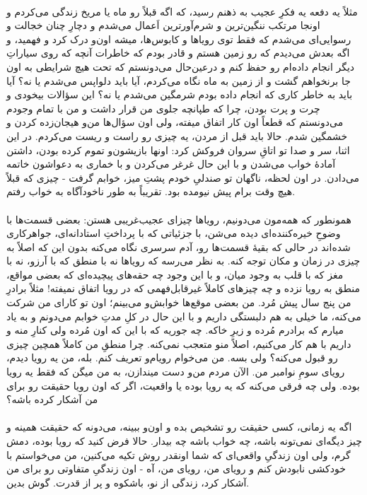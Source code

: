 \documentclass[12pt]{book}
\begin{document}
    \paragraph{}
    مثلاً یه دفعه یه فکرِ عجیب به ذهنم رسید، که اگه قبلاً رو ماه یا مریخ زندگی می‌کردم و اونجا مرتکب ننگین‌ترین و شرم‌آور‌ترین اَعمال می‌شدم و دچارِ چنان خجالت و رسوایی‌ای می‌شدم که فقط توی رویاها و کابوس‌ها، میشه اون‌و درک کرد و فهمید، و اگه بعدش می‌دیدم که رو زمین هستم و قادر بودم که خاطرات آنچه که روی سیاراتِ دیگر انجام داده‌ام رو حفظ کنم و درعین‌حال می‌دونستم که تحت هیچ شرایطی به اون جا برنخواهم گشت و از زمین به ماه نگاه می‌کردم، آیا باید دلواپس می‌شدم یا نه؟ آیا باید به خاطر کاری که انجام داده بودم شرمگین می‌شدم یا نه؟ این سؤالات بیخودی و چرت و پرت بودن، چرا که طپانچه جلوی من قرار داشت و من با تمام وجودم می‌دونستم که قطعاً اون کار اتفاق میفته، ولی اون سؤال‌ها من‌و هیجان‌زده کردن و خشمگین شدم. حالا باید قبل از مردن، یه چیزی رو راست و ریست می‌کردم. در این اثنا، سر و صدا تو اتاقِ سروان فروکش کرد: اونها بازیشون‌و تموم کرده بودن، داشتن آمادهٔ خواب می‌شدن و با این حال غرغر می‌کردن و با خماری به دعواشون خاتمه می‌دادن. در اون لحظه، ناگهان تو صندلیِ خودم پشتِ میز، خوابم گرفت - چیزی که قبلاً هیچ وقت برام پیش نیومده بود. تقریباً به طور ناخودآگاه به خواب رفتم.

    \paragraph{}
    همونطور که همه‌مون می‌دونیم، رویاها چیزای عجیب‌غریبی هستن: بعضی قسمت‌ها با وضوحِ خیره‌کننده‌ای دیده می‌شن، با جزئیاتی که با پرداختِ استادانه‌ای، جواهرکاری شده‌اند در حالی که بقیهٔ قسمت‌ها رو، آدم سرسری نگاه می‌کنه بدون این که اصلاً به چیزی در زمان و مکان توجه کنه. به نظر می‌رسه که رویاها نه با منطق که با آرزو، نه با مغز که با قلب به وجود میان، و با این وجود چه حقه‌های پیچیده‌ای که بعضی مواقع، منطق به رویا نزده و چه چیزهای کاملاً غیرقابل‌فهمی که در رویا اتفاق نمیفته! مثلاً برادرِ من پنج سال پیش مُرد. من بعضی موقع‌ها خوابش‌و می‌بینم؛ اون تو کارای من شرکت می‌کنه، ما خیلی به هم دلبستگی داریم و با این حال در کلِ مدتِ خوابم می‌دونم و به یاد میارم که برادرم مُرده و زیرِ خاکه. چه جوریه که با این که اون مُرده ولی کنارِ منه و داریم با هم کار می‌کنیم، اصلاً منو متعجب نمی‌کنه. چرا منطقِ من کاملاً همچین چیزی رو قبول می‌کنه؟ ولی بسه. من می‌خوام رویام‌و تعریف کنم. بله، من یه رویا دیدم، رویای سومِ نوامبر من. الآن مردم من‌و دست میندازن، به من میگن که فقط یه رویا بوده. ولی چه فرقی می‌کنه که یه رویا بوده یا واقعیت، اگر که اون رویا حقیقت رو برای من آشکار کرده باشه؟

    \paragraph{}
    اگه یه زمانی، کسی حقیقت رو تشخیص بده و اون‌و ببینه، می‌دونه که حقیقت همینه و چیز دیگه‌ای نمی‌تونه باشه، چه خواب باشه چه بیدار. حالا فرض کنید که رویا بوده، دمش گرم، ولی اون زندگیِ واقعی‌ای که شما اونقدر روش تکیه می‌کنین، من می‌خواستم با خودکشی نابودش کنم و رویای من، رویای من، آه - اون زندگیِ متفاوتی رو برای من آشکار کرد، زندگی از نو، باشکوه و پر از قدرت. گوش بدین.
\end{document}
